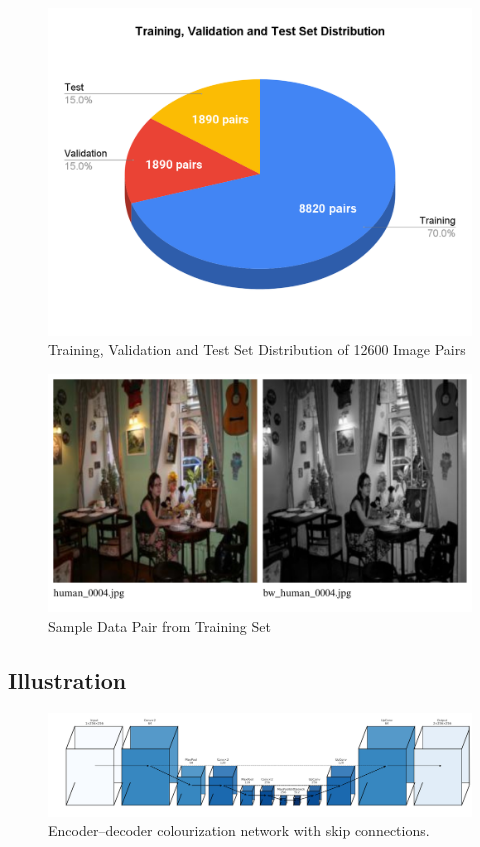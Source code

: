 \documentclass{article} %
\begin{document}
\begin{figure}[htbp]            %
  \centering
  \includegraphics[width=0.65\linewidth]{Figs/dataset1.png}
  \caption{Training, Validation and Test Set Distribution of 12600 Image Pairs}
  \label{fig:dataset}
\end{figure}

\begin{figure}[htbp]            %
  \centering
  \includegraphics[width=0.65\linewidth]{Figs/Data Example.png}
  \caption{Sample Data Pair from Training Set}
  \label{fig:data_example}
\end{figure}

\subsection{Illustration}

\begin{figure}[htbp]            %
  \centering
  \includegraphics[width=0.9\linewidth]{Figs/architecture.png}
  \caption{Encoder–decoder colourization network with skip connections.}
  \label{fig:architecture}
\end{figure}
\end{document}
